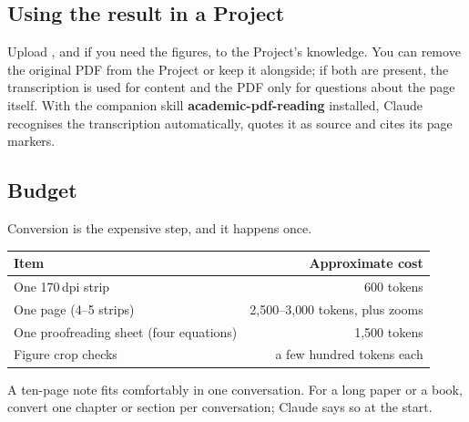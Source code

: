 \documentclass[11pt,a4paper]{article}
\begin{document}
\subsection{Using the result in a Project}
Upload , and  if you need the figures, to the Project's
knowledge. You can remove the original PDF from the Project or keep it alongside; if both are
present, the transcription is used for content and the PDF only for questions about the page
itself. With the companion skill \textbf{academic-pdf-reading} installed, Claude recognises the
transcription automatically, quotes it as source and cites its page markers.

\subsection{Budget}
Conversion is the expensive step, and it happens once.
\begin{center}
\small
\begin{tabular}{@{}l r@{}}
\toprule
\textbf{Item} & \textbf{Approximate cost} \\
\midrule
One 170\,dpi strip & 600 tokens \\
One page (4--5 strips) & 2{,}500--3{,}000 tokens, plus zooms \\
One proofreading sheet (four equations) & 1{,}500 tokens \\
Figure crop checks & a few hundred tokens each \\
\bottomrule
\end{tabular}
\end{center}
A ten-page note fits comfortably in one conversation. For a long paper or a book, convert one
chapter or section per conversation; Claude says so at the start.

\end{document}
